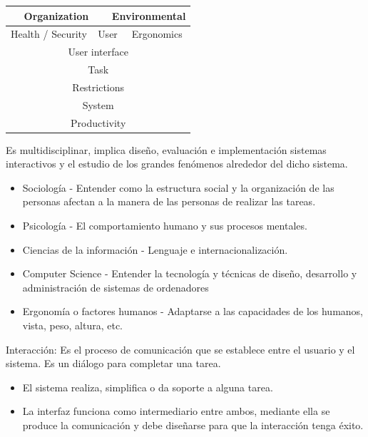\documentclass[12pt, twoside, openright]{report} %
\begin{document}
	\begin{table}[h]
		\begin{tabular}{|c|c|c|c|}
		\hline
		\multicolumn{2}{|c|}{Organization}   & \multicolumn{2}{c|}{Environmental}   \\ \hline
		Health / Security        & \multicolumn{2}{c|}{User} & Ergonomics           \\ \hline
		\multicolumn{4}{|c|}{User interface}                                        \\ \hline
		\multicolumn{4}{|c|}{Task}                                                  \\ \hline
		\multicolumn{4}{|c|}{Restrictions}                                          \\ \hline
		\multicolumn{4}{|c|}{System}                                                \\ \hline
		\multicolumn{4}{|c|}{Productivity}                                          \\ \hline
		\end{tabular}
		\end{table}
   

    Es multidisciplinar, implica diseño, evaluación e implementación
    sistemas interactivos y el estudio de los grandes fenómenos
    alrededor del dicho sistema.

    \begin{itemize}
    
    \item
      Sociología - Entender como la estructura social y la organización
      de las personas afectan a la manera de las personas de realizar
      las tareas.
    \item
      Psicología - El comportamiento humano y sus procesos mentales.
    \item
      Ciencias de la información - Lenguaje e internacionalización.
    \item
      Computer Science - Entender la tecnología y técnicas de diseño,
      desarrollo y administración de sistemas de ordenadores
    \item
      Ergonomía o factores humanos - Adaptarse a las capacidades de los
      humanos, vista, peso, altura, etc.
    \end{itemize}

	Interacción: Es el proceso de comunicación que se establece entre el
    usuario y el sistema. Es un diálogo para completar una tarea.

    \begin{itemize}
    
    \item
      El sistema realiza, simplifica o da soporte a alguna tarea.
    \item
      La interfaz funciona como intermediario entre ambos, mediante ella
      se produce la comunicación y debe diseñarse para que la
      interacción tenga éxito.
    \end{itemize}
\end{document}
